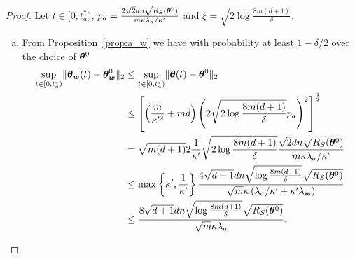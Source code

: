 \documentclass{article}
\begin{document}
\begin{proof}
    Let $t\in[0, t^*_a)$, $p_a=\frac{2\sqrt{2}dn\sqrt{R_S(\bm{\theta}^0)}}{m\kappa\lambda_a/\kappa'}$ and $\xi=\sqrt{2\log\frac{8m(d+1)}{\delta}}$.
    \begin{enumerate}[(a)]
        \item From Proposition~\ref{prop:a_w} we have with probability at least $1-\delta/2$ over the choice of $\bm{\theta}^0$
              \begin{equation}
                  \begin{aligned}
                      \sup\limits_{t\in[0,t^*_a)}\lVert\bm{\theta}_{\bm{w}}(t)-\bm{\theta}_{\bm{w}}^0\rVert_2
                      &\leq \sup\limits_{t\in[0,t^*_a)}\lVert\bm{\theta}(t)-\bm{\theta}^0\rVert_2\\
                       & \leq \left[\left(\frac{m}{\kappa'^2}+md\right)\left(2\sqrt{2\log\frac{8m(d+1)}{\delta}}p_a\right)^2\right]^{\frac{1}{2}}                                                         \\
                       & =\sqrt{m(d+1)}2\frac{1}{\kappa'}\sqrt{2\log\frac{8m(d+1)}{\delta}}\frac{\sqrt{2}dn\sqrt{R_S(\bm{\theta}^0)}}{m\kappa\lambda_a/\kappa'}                                               \\
                       & \leq\max\left\{\kappa',\frac{1}{\kappa'}\right\}\frac{4\sqrt{d+1}dn\sqrt{\log\frac{8m(d+1)}{\delta}}\sqrt{R_S(\bm{\theta}^0)}}{\sqrt{m}\kappa\left(\lambda_a/\kappa'+\kappa'\lambda_{\bm{w}}\right)} \\
                       & \leq\frac{8\sqrt{d+1}dn\sqrt{\log\frac{8m(d+1)}{\delta}}\sqrt{R_S(\bm{\theta}^0)}}{\sqrt{m}\kappa\lambda_a}.
                  \end{aligned}
              \end{equation}


\end{enumerate}
\end{proof}
\end{document}
